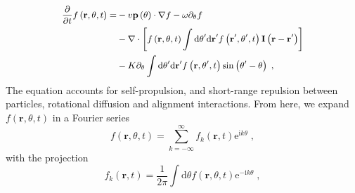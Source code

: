 \documentclass[a4paper, amsfonts, amssymb, amsmath, reprint, showkeys, showpacs, nofootinbib, twoside]{revtex4-2}
\begin{document}
\begin{equation}
    \small
    \begin{aligned}
        \frac{\partial}{\partial t}f\left( \mathbf{r},\theta ,t \right) =&-v\mathbf{p}\left( \theta \right) \cdot \nabla f-\omega \partial _{\theta}f\\
        &-\nabla \cdot \left[ f\left( \mathbf{r},\theta ,t \right) \int{\mathrm{d}\theta ^{\prime}\mathrm{d}\mathbf{r}^{\prime}f\left( \mathbf{r}^{\prime},\theta ^{\prime},t \right) \mathbf{I}\left( \mathbf{r}-\mathbf{r}^{\prime} \right)} \right]\\
        &-K\partial _{\theta}\int{\mathrm{d}\theta ^{\prime}\mathrm{d}\mathbf{r}^{\prime}f\left( \mathbf{r},\theta ^{\prime},t \right) \sin \left( \theta ^{\prime}-\theta \right) \;,}\\
    \end{aligned}
\end{equation}
The equation accounts for self-propulsion, and short-range repulsion between particles, rotational diffusion and alignment interactions. 
From here, we expand $f\left( \mathbf{r},\theta ,t \right)$ in a Fourier series 
\begin{equation}
    f \left( \mathbf{r},\theta ,t \right) =\sum_{k=-\infty}^{\infty}{f _{k}\left( \mathbf{r},t \right) \mathrm{e}^{\mathrm{i}k\theta}}\;,
\end{equation} 
with the projection 
\begin{equation}
    \label{eq:fourierCoefficients}
    f _{k}\left( \mathbf{r},t \right) =\frac{1}{2\pi}\int{\mathrm{d}\theta f \left( \mathbf{r},\theta ,t \right) \mathrm{e}^{-\mathrm{i}k\theta}}\;,
\end{equation}
\end{document}
